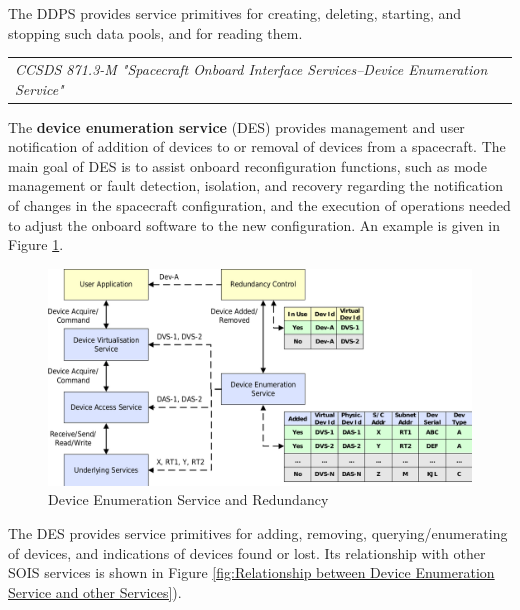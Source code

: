 The DDPS provides service primitives for creating, deleting, starting, and stopping such data pools, and for reading them.

\begin{tabular}{l}
\textit{CCSDS 871.3-M "Spacecraft Onboard Interface Services--Device Enumeration Service" \cite{}} 
\end{tabular}

The \textbf{device enumeration service} (DES) provides management and user notification of addition of devices to or removal of devices from a spacecraft. The main goal of DES is to assist onboard reconfiguration functions, such as mode management or fault detection, isolation, and recovery regarding the notification of changes in the spacecraft configuration, and the execution of operations needed to adjust the onboard software to the new configuration. An example is given in Figure \ref{fig:Device Enumeration Service and Redundancy}.

\begin{figure}[h]
\centering\includegraphics[scale=0.3]{fig/device_enumeration_service_and_redundancy}
\caption{Device Enumeration Service and Redundancy}
\label{fig:Device Enumeration Service and Redundancy}
\end{figure}

The DES provides service primitives for adding, removing, querying/enumerating of devices, and indications of devices found or lost. Its relationship with other SOIS services is shown in Figure \ref{fig:Relationship between Device Enumeration Service and other Services}).

